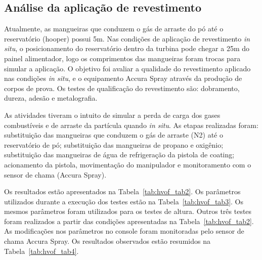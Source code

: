 \subsection{Análise da aplicação de revestimento}

Atualmente, as mangueiras que conduzem o gás de arraste do pó até o
reservatório (hooper) possui 5m. Nas condições de aplicação de revestimento
\textit{in situ}, o posicionamento do reservatório dentro da turbina pode chegar
a 25m do painel alimentador, logo os comprimentos das mangueiras foram trocas
para simular a aplicação. O objetivo foi avaliar a qualidade do revestimento
aplicado nas condições \textit{in situ}, e o equipamento Accura Spray através
da produção de corpos de prova. Os testes de qualificação do revestimento são:
dobramento, dureza, adesão e metalografia.

As atividades tiveram o intuito de simular a perda de carga dos gases
combustíveis e de arraste da partícula quando \textit{in situ}. As etapas
realizadas foram: substituição das mangueiras que conduzem o gás de arraste (N2)
até o reservatório de pó; substituição das mangueiras de propano e oxigênio;
substituição das mangueiras de água de refrigeração da pistola de coating;
acionamento da pistola, movimentação do manipulador e monitoramento com o sensor
de chama (Accura Spray).

Os resultados estão apresentados na Tabela~\ref{tab:hvof_tab2}. Os parâmetros
utilizados durante a execução dos testes estão na Tabela~\ref{tab:hvof_tab3}. Os
mesmos parâmetros foram utilizados para os testes de altura. Outros três testes
foram realizados a partir das condições apresentadas na
Tabela~\ref{tab:hvof_tab2}. As modificações nos parâmetros no console foram
monitoradas pelo sensor de chama Accura Spray. Os resultados observados estão
resumidos na Tabela~\ref{tab:hvof_tab4}.

